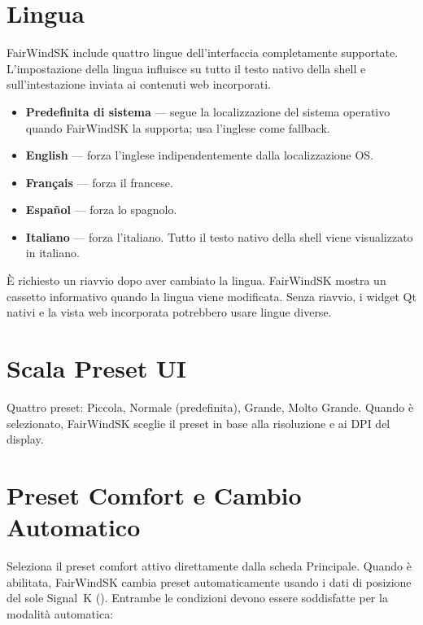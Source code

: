 \section{Lingua}

FairWindSK include quattro lingue dell'interfaccia completamente supportate.
L'impostazione della lingua influisce su tutto il testo nativo della shell e
sull'intestazione  inviata ai contenuti web incorporati.

\begin{itemize}
  \item \textbf{Predefinita di sistema} --- segue la localizzazione del sistema operativo
        quando FairWindSK la supporta; usa l'inglese come fallback.
  \item \textbf{English} --- forza l'inglese indipendentemente dalla localizzazione OS.
  \item \textbf{Français} --- forza il francese.
  \item \textbf{Español} --- forza lo spagnolo.
  \item \textbf{Italiano} --- forza l'italiano. Tutto il testo nativo della shell
        viene visualizzato in italiano.
\end{itemize}

\begin{warningbox}
È richiesto un riavvio dopo aver cambiato la lingua.
FairWindSK mostra un cassetto informativo quando la lingua viene modificata.
Senza riavvio, i widget Qt nativi e la vista web incorporata potrebbero usare
lingue diverse.
\end{warningbox}

\section{Scala Preset UI}

Quattro preset: Piccola, Normale (predefinita), Grande, Molto Grande.
Quando  è selezionato, FairWindSK sceglie il preset
in base alla risoluzione e ai DPI del display.

\section{Preset Comfort e Cambio Automatico}

Seleziona il preset comfort attivo direttamente dalla scheda Principale.
Quando  è abilitata, FairWindSK cambia preset automaticamente
usando i dati di posizione del sole Signal~K ().
Entrambe le condizioni devono essere soddisfatte per la modalità automatica:

